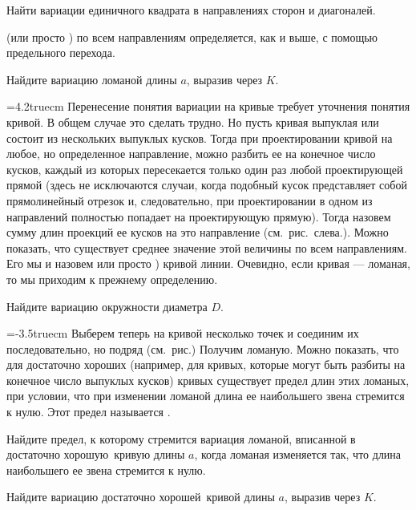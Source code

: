 \documentclass[10pt]{article}
\begin{document}
Найти вариации единичного квадрата %
в направлениях %
сторон и диагоналей.

 (или просто )
по всем \noindent направлениям определяется, как и выше, с помощью предельного
перехода.


Найдите вариацию ломаной длины $a$, выразив через $K$.

\hangindent=4.2truecm
Перенесение понятия вариации на кривые требует уточнения понятия кривой.
В общем случае это сделать трудно. Но пусть кривая выпуклая или состоит
из нескольких выпуклых кусков. Тогда при проектировании кривой на любое,
но определенное направление, можно разбить ее на конечное число кусков,
каждый из которых пересекается только один раз любой
проектирующей прямой (здесь не исключаются случаи, когда подобный кусок
представляет собой прямолинейный отрезок и, следовательно, при
проектировании в одном из направлений полностью попадает на
проектирующую прямую).  Тогда  назовем сумму длин проекций ее кусков на это направление
(см.~рис.~слева.). Можно показать, что существует среднее значение этой величины
по всем направлениям. Его мы и назовем
 или просто ) кривой линии.
Очевидно, если кривая --- ломаная,
то мы приходим к прежнему определению.

Найдите вариацию окружности диаметра $D$.

\hangindent=-3.5truecm
Выберем теперь на кривой несколько точек и соединим их последовательно,
но подряд (см.~рис.) Получим ломаную. Можно показать, что для достаточно
хороших (например, для кривых, которые могут быть разбиты на
конечное число выпуклых кусков) кривых существует предел длин
этих ломаных, при условии, что при изменении ломаной длина ее наибольшего
звена стремится к нулю. Этот предел называется .



Найдите предел, к которому стремится вариация ломаной, вписанной в
 достаточно хорошую\ кривую длины $a$, когда ломаная изменяется
так, что длина наибольшего ее звена стремится к нулю.

Найдите вариацию  достаточно хорошей\ кривой длины $a$, выразив через $K$.
\end{document}
